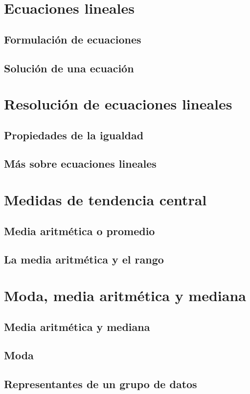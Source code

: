 \documentclass[11pt]{book}
\begin{document}
\section{Ecuaciones lineales}
\subsection{Formulación de ecuaciones}
\subsection{Solución de una ecuación}

\section{Resolución de ecuaciones lineales}
\subsection{Propiedades de la igualdad}
\subsection{Más sobre ecuaciones lineales}

\section{Medidas de tendencia central}
\subsection{Media aritmética o promedio}
\subsection{La media aritmética y el rango}

\section{Moda, media aritmética y mediana}
\subsection{Media aritmética y mediana}
\subsection{Moda}
\subsection{Representantes de un grupo de datos}
\end{document}
